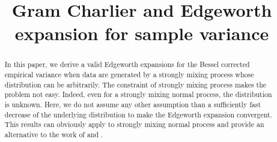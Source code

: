 \documentclass{imsart}
\numberwithin{equation}{section}
\theoremstyle{plain}
\theoremstyle{remark}
\begin{document}
\begin{frontmatter}
\title{Gram Charlier and Edgeworth expansion for sample variance}

\begin{aug}
\author{ }

\address[a]{A.I. SQUARE CONNECT, 35 Boulevard d'Inkermann 92200 Neuilly sur Seine, France and LAMSADE, Université Paris Dauphine, Place du Maréchal de Lattre de Tassigny,75016 Paris, France.}



\end{aug}

\begin{abstract}
In this paper, we derive a valid Edgeworth expansions for the 
Bessel corrected empirical variance when data are generated
by a strongly mixing process whose distribution can be arbitrarily. 
The constraint of strongly mixing process makes the problem not easy. 
Indeed, even for a strongly mixing normal process, the distribution is unknown.
Here, we do not assume any other assumption than a sufficiently fast decrease of
the underlying distribution to make the Edgeworth expansion convergent.
This results can obviously apply to strongly mixing normal process and provide
an alternative to the work of \cite{Moschopoulos_1985} and \cite{Mathai_1982}.

\end{abstract}

\begin{keyword}
\end{keyword}

\end{frontmatter}

\end{document}
